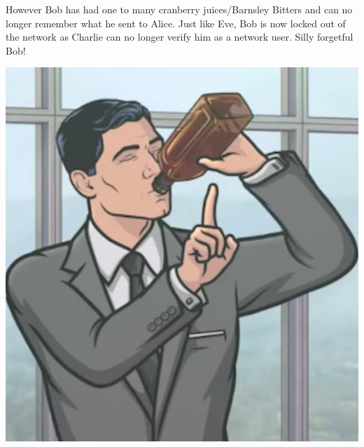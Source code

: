\documentclass[portrait,final,archA0,fontscale=0.3]{baposter}
\begin{document}
\begin{poster}
{\vspace{0.3cm}

\noindent However Bob has had one to many cranberry juices/Barnsley Bitters and can no longer remember what he sent to Alice. Just like Eve, Bob is now locked out of the network as Charlie can no longer verify him as a network user. Silly forgetful Bob!  

\begin{center}
    \includegraphics[width=0.45\linewidth]{img/drunk_spy} 
\end{center} 

}


\end{poster}
\end{document}
